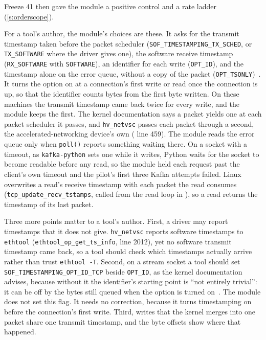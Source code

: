 \documentclass[10pt,journal,onecolumn]{IEEEtran}
\newcommand{\kafka}{Kafka}
\begin{document}
Freeze 41 then gave the module a positive control and a rate ladder (\ref{s:orderscope}).

For a tool's author, the module's choices are these. It asks for the transmit timestamp taken
before the packet scheduler (\texttt{SOF\_TIMESTAMPING\_TX\_SCHED}, or \texttt{TX\_SOFTWARE} where
the driver gives one), the software receive timestamp (\texttt{RX\_SOFTWARE} with
\texttt{SOFTWARE}), an identifier for each write (\texttt{OPT\_ID}), and the timestamp alone on the
error queue, without a copy of the packet (\texttt{OPT\_TSONLY})~\cite{linux_timestamping}. It
turns the option on at a connection's first write or read once the connection is up, so that the
identifier counts bytes from the first byte written. On these machines the transmit timestamp came
back twice for every write, and the module keeps the first. The kernel documentation says a packet
yields one at each packet scheduler it passes, and \texttt{hv\_netvsc} passes each packet through a
second, the accelerated-networking device's own ( line 459). The module reads the
error queue only when \texttt{poll()} reports something waiting there. On a socket with a timeout,
as \texttt{kafka-python} sets one while it writes, Python waits for the socket to become readable
before any read, so the module held each request past the client's own timeout and the pilot's
first three \kafka{} attempts failed. Linux overwrites a read's receive timestamp with each packet
the read consumes (\texttt{tcp\_update\_recv\_tstamps}, called from the read loop in
), so a read returns the timestamp of its last packet.

Three more points matter to a tool's author. First, a driver may report timestamps that it does
not give. \texttt{hv\_netvsc} reports software timestamps to \texttt{ethtool}
(\texttt{ethtool\_op\_get\_ts\_info},  line 2012), yet no software transmit
timestamp came back, so a tool should check which timestamps actually arrive rather than trust
\texttt{ethtool -T}. Second, on a stream socket a tool should set
\texttt{SOF\_TIMESTAMPING\_OPT\_ID\_TCP} beside \texttt{OPT\_ID}, as the kernel documentation
advises, because without it the identifier's starting point is ``not entirely trivial'': it can be
off by the bytes still queued when the option is turned on~\cite{linux_timestamping}. The module
does not set this flag. It needs no correction, because it turns timestamping on before the
connection's first write. Third, writes that the kernel merges into one packet share one transmit
timestamp, and the byte offsets show where that happened.
\end{document}
